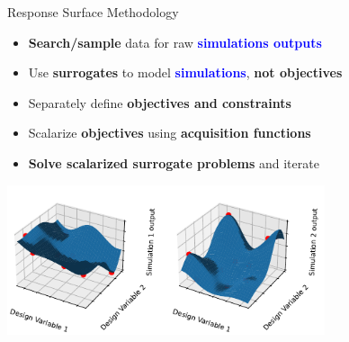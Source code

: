 \documentclass[a0paper,landscape]{baposter}
\newcommand{\BLUE}[1]{\textcolor{blue}{\bf #1}}
\newcommand{\RED}[1]{\textcolor{ArgonneLogoRed}{\bf #1}}
\newcommand{\GREEN}[1]{\textcolor{ArgonneLogoGreen}{\bf #1}}
\begin{document}
\begin{poster}
\begin{posterbox}[name=ampl,column=1,row=0]{Response Surface Methodology}
  \begin{itemize}
    \item \GREEN{Search/sample} data for raw \BLUE{simulations outputs}
    \item Use \GREEN{surrogates} to model \BLUE{simulations}, \RED{not objectives}
    \item Separately define \RED{objectives and constraints}
    \item Scalarize \RED{objectives} using \GREEN{acquisition functions}
    \item \GREEN{Solve scalarized surrogate problems} and iterate
  \end{itemize}
  \begin{center}
  \includegraphics[width=0.7\textwidth]{surrogate-models.pdf}
  \end{center}
\end{posterbox}


\end{poster}
\end{document}
